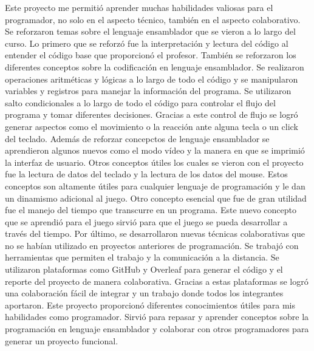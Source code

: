 \documentclass[12pt]{article}
\begin{document}
Este proyecto me permitió aprender muchas habilidades valiosas para el programador, no solo en el aspecto técnico, también en el aspecto colaborativo. Se reforzaron temas sobre el lenguaje ensamblador que se vieron a lo largo del curso. Lo primero que se reforzó fue la interpretación y lectura del código al entender el código base que proporcionó el profesor. También se reforzaron los diferentes conceptos sobre la codificación en lenguaje ensamblador. Se realizaron operaciones aritméticas y lógicas a lo largo de todo el código y se manipularon variables y registros para manejar la información del programa. Se utilizaron salto condicionales a lo largo de todo el código para controlar el flujo del programa y tomar diferentes decisiones. Gracias a este control de flujo se logró generar aspectos como el movimiento o la reacción ante alguna tecla o un click del teclado. Además de reforzar concepctos de lenguaje ensamblador se aprendieron algunos nuevos como el modo vídeo y la manera en que se imprimió la interfaz de usuario. Otros conceptos útiles los cuales se vieron con el proyecto fue la lectura de datos del teclado y la lectura de los datos del mouse. Estos conceptos son altamente útiles para cualquier lenguaje de programación y le dan un dinamismo adicional al juego. Otro concepto esencial que fue de gran utilidad fue el manejo del tiempo que transcurre en un programa. Este nuevo concepto que se aprendió para el juego sirvió para que el juego se pueda desarrollar a través del tiempo. Por último, se desarrollaron nuevas técnicas colaborativas que no se habían utilizado en proyectos anteriores de programación. Se trabajó con herramientas que permiten el trabajo y la comunicación a la distancia. Se utilizaron plataformas como GitHub y Overleaf para generar el código y el reporte del proyecto de manera colaborativa. Gracias a estas plataformas se logró una colaboración fácil de integrar y un trabajo donde todos los integrantes aportaron. Este proyecto proporcionó diferentes conocimientos útiles para mis habilidades como programador. Sirvió para repasar y aprender conceptos sobre la programación en lenguaje ensamblador y colaborar con otros programadores para generar un proyecto funcional.
\end{document}
